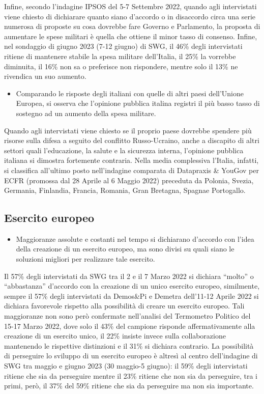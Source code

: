 \documentclass[
]{book}
\providecommand{\tightlist}{%
  \setlength{\itemsep}{0pt}\setlength{\parskip}{0pt}}
\begin{document}
Infine, secondo l'indagine IPSOS del 5-7 Settembre 2022, quando agli intervistati viene chiesto di dichiarare quanto siano d'accordo o in disaccordo circa una serie numerosa di proposte su cosa dovrebbe fare Governo e Parlamento, la proposta di aumentare le spese militari è quella che ottiene il minor tasso di consenso. Infine, nel sondaggio di giugno 2023 (7-12 giugno) di SWG, il 46\% degli intervistati ritiene di mantenere stabile la spesa militare dell'Italia, il 25\% la vorrebbe diminuita, il 16\% non sa o preferisce non rispondere, mentre solo il 13\% ne rivendica un suo aumento.

\begin{itemize}
\tightlist
\item
  Comparando le risposte degli italiani con quelle di altri paesi dell'Unione Europea, si osserva che l'opinione pubblica italina registri il più basso tasso di sostegno ad un aumento della spesa militare.
\end{itemize}

Quando agli intervistati viene chiesto se il proprio paese dovrebbe spendere più risorse sulla difesa a seguito del conflitto Russo-Ucraino, anche a discapito di altri settori quali l'educazione, la salute e la sicurezza interna, l'opinione pubblica italiana si dimostra fortemente contraria. Nella media complessiva l'Italia, infatti, si classifica all'ultimo posto nell'indagine comparata di Datapraxis \& YouGov per ECFR (promossa dal 28 Aprile al 6 Maggio 2022) preceduta da Polonia, Svezia, Germania, Finlandia, Francia, Romania, Gran Bretagna, Spagnae Portogallo.

\hypertarget{esercito-europeo}{%
\subsection{Esercito europeo}\label{esercito-europeo}}

\begin{itemize}
\tightlist
\item
  Maggioranze assolute e costanti nel tempo si dichiarano d'accordo con l'idea della creazione di un esercito europeo, ma sono divisi su quali siano le soluzioni migliori per realizzare tale esercito.
\end{itemize}

Il 57\% degli intervistati da SWG tra il 2 e il 7 Marzo 2022 si dichiara ``molto'' o ``abbastanza'' d'accordo con la creazione di un unico esercito europeo, similmente, sempre il 57\% degli intervistati da Demos\&Pi e Demetra dell'11-12 Aprile 2022 si dichiara favorevole rispetto alla possibilità di creare un esercito europeo. Tali maggioranze non sono però confermate nell'analisi del Termometro Politico del 15-17 Marzo 2022, dove solo il 43\% del campione risponde affermativamente alla creazione di un esercito unico, il 22\% insiste invece sulla collaborazione mantenendo le rispettive distinzioni e il 31\% si dichiara contrario. La possibilità di perseguire lo sviluppo di un esercito europeo è altresì al centro dell'indagine di SWG tra maggio e giugno 2023 (30 maggio-5 giugno): il 59\% degli intervistati ritiene che sia da perseguire mentre il 23\% ritiene che non sia da perseguire, tra i primi, però, il 37\% del 59\% ritiene che sia da perseguire ma non sia importante.
\end{document}
